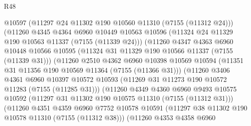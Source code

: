 \begin{lexlean}{R48}
\begin{coremodule}
                            @10597
                            (@11297 @24 @11302 @190 @10560 @11310 (@7155 (@11312 @24)))
                            (@11260
                              @4345
                              @4364
                              @6960
                              @10449
                              @10563
                              @10596
                              (@11324 @24 @11329 @190 @10563 @11337 (@7155 (@11339 @24)))
                              (@11260
                                @4347
                                @4363
                                @6960
                                @10448
                                @10566
                                @10595
                                (@11324 @31 @11329 @190 @10566 @11337 (@7155 (@11339 @31)))
                                (@11260
                                  @2510
                                  @4362
                                  @6960
                                  @10398
                                  @10569
                                  @10594
                                  (@11351 @31 @11356 @190 @10569 @11364 (@7155 (@11366 @31)))
                                  (@11260
                                    @3406
                                    @4361
                                    @6960
                                    @10397
                                    @10572
                                    @10593
                                    (@11269 @31 @11273 @190 @10572 @11283 (@7155 (@11285 @31)))
                                    (@11260
                                      @4349
                                      @4360
                                      @6960
                                      @9493
                                      @10575
                                      @10592
                                      (@11297 @31 @11302 @190 @10575 @11310 (@7155 (@11312 @31)))
                                      (@11260
                                        @4351
                                        @4359
                                        @6960
                                        @7752
                                        @10578
                                        @10591
                                        (@11297 @38 @11302 @190 @10578 @11310 (@7155 (@11312 @38)))
                                        (@11260
                                          @4353
                                          @4358
                                          @6960

\end{coremodule}
\end{lexlean}
